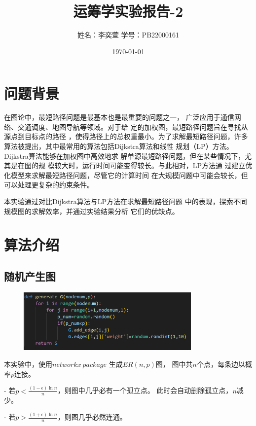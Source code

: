 \documentclass[10pt,a4paper,oneside]{article}
\title{\bf 运筹学实验报告-2}
\author{姓名：李奕萱  学号：PB22000161 }
\date{\today}
\begin{document}
\maketitle

\section{问题背景}

在图论中，最短路径问题是最基本也是最重要的问题之一，
广泛应用于通信网络、交通调度、地图导航等领域。对于给
定的加权图，最短路径问题旨在寻找从源点到目标点的路径
，使得路径上的总权重最小。为了求解最短路径问题，许多
算法被提出，其中最常用的算法包括Dijkstra算法和线性
规划（LP）方法。Dijkstra算法能够在加权图中高效地求
解单源最短路径问题，但在某些情况下，尤其是在图的规
模较大时，运行时间可能变得较长。与此相对，LP方法通
过建立优化模型来求解最短路径问题，尽管它的计算时间
在大规模问题中可能会较长，但可以处理更复杂的约束条件。

本实验通过对比Dijkstra算法与LP方法在求解最短路径问题
中的表现，探索不同规模图的求解效率，并通过实验结果分析
它们的优缺点。

\section{算法介绍}

\subsection{随机产生图}

\begin{figure}[H]
    \centering
    \includegraphics[width=0.8\textwidth]{屏幕截图 2024-10-18 132429.png}
\end{figure}

本实验中，使用$networkx\ package$ 生成$ER(n,p)$图，
图中共$n$个点，每条边以概率$p$连接。

- 若$p<\frac{(1-\epsilon)\ln n}{n}$，则图中几乎必有一个孤立点。
此时会自动删除孤立点，$n$减少。

- 若$p>\frac{(1+\epsilon)\ln n}{n}$，则图几乎必然连通。
\end{document}
